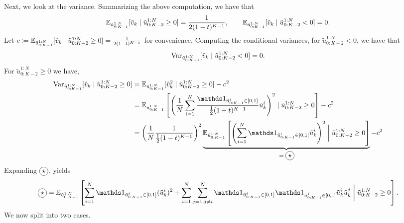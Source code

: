 Next, we look at the variance.
Summarizing the above computation, we have that
\begin{equation}
    \mathbb{E}_{\tilde{u}_{0:K-1}^{1:N}}[ \hat{v}_k \mid \tilde{u}_{0:K-2}^{1:N} \geq 0 ]
    = \frac{1}{2 (1-t)^{K-1} }, \qquad 
    \mathbb{E}_{\tilde{u}_{0:K-1}^{1:N}}[ \hat{v}_k \mid \tilde{u}_{0:K-2}^{1:N} < 0 ] = 0.
\end{equation}
Let $c \coloneqq \mathbb{E}_{\tilde{u}_{0:K-1}^{1:N}}[ \hat{v}_k \mid \tilde{u}_{0:K-2}^{1:N} \geq 0 ]
    = \frac{1}{2 (1-t)^{K-1} }$ for convenience.
Computing the conditional variances, for $\tilde{u}_{0:K-2}^{1:N} < 0$, we have that
\begin{equation}
    \operatorname{Var}_{\tilde{u}_{0:K-1}^{1:N}}[ \hat{v}_k \mid \tilde{u}_{0:K-2}^{1:N} < 0 ] = 0.
\end{equation}
For $\tilde{u}_{0:K-2}^{1:N} \geq 0 $ we have,
\begin{align}
    \Var_{\tilde{u}_{0:K-1}^{1:N}}[ \hat{v}_k \mid \tilde{u}_{0:K-2}^{1:N} \geq 0 ]
    &= \E_{\tilde{u}_{0:K-1}^{1:N}}[ \hat{v}_k^2 \mid \tilde{u}_{0:K-2}^{1:N} \geq 0 ] - c^2 \\
    &= \E_{\tilde{u}_{0:K-1}^{1:N}}\left[
        \left( \frac{1}{N} \sum_{i=1}^N \frac{ \ind{\tilde{u}^i_{0:K-1} \in [0, 1]} }{ \frac{1}{2} (1 - t)^{K-1} } \tilde{u}^i_k \right)^2
    \mid \tilde{u}_{0:K-2}^{1:N} \geq 0 \right] - c^2 \\
    &= \left( \frac{1}{N} \frac{1}{ \frac{1}{2} (1-t)^{K-1} } \right)^2
        \underbrace{\E_{\tilde{u}_{0:K-1}^{1:N}}\left[
            \left( \sum_{i=1}^N \ind{\tilde{u}^i_{0:K-1} \in [0, 1]} \tilde{u}^i_k \right)^2
    \mathrel{\bigg|} \tilde{u}_{0:K-2}^{1:N} \geq 0 \right]}_{\coloneqq\; \circled{$\star$}} - c^2\label{eq:star}
\end{align}
Expanding $\circled{$\star$}$, yields
\begin{equation} \label{eq: var_proof:star}
    \circled{$\star$}
    = \E_{\tilde{u}_{0:K-1}^{1:N}}\left[
            \sum_{i=1}^N \ind{\tilde{u}^i_{0:K-1} \in [0, 1]} (\tilde{u}^i_k)^2 +
            \sum_{i=1}^N \sum_{j=1, j\not=i}^N \ind{\tilde{u}^i_{0:K-1} \in [0, 1]} \ind{\tilde{u}^j_{0:K-1} \in [0, 1]} \tilde{u}^i_k \tilde{u}^j_k
    \mathrel{\bigg|} \tilde{u}_{0:K-2}^{1:N} \geq 0 \right].
\end{equation}
We now split into two cases.

\vspace{.5\baselineskip}

